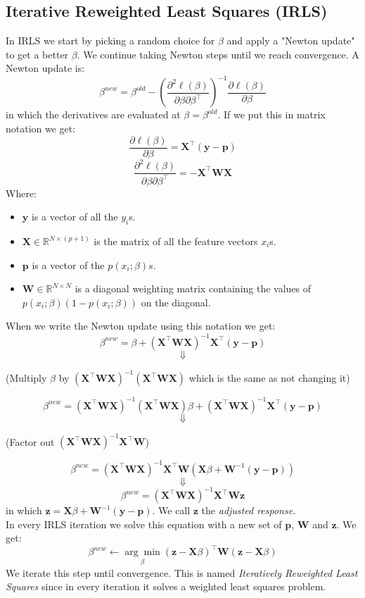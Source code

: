 \documentclass[a4paper]{article}
\begin{document}
\subsection{Iterative Reweighted Least Squares (IRLS)}
In IRLS we start by picking a random choice for $\beta$ and apply a "Newton update" to get a better $\beta$. We continue taking Newton steps until we reach convergence. 
A Newton update is:
$$\beta^{new} = \beta^{old} - \left(\frac{\partial^2 \ell(\beta)}{\partial \beta\partial \beta^\top}\right)^{-1}\frac{\partial \ell(\beta)}{\partial \beta}$$
in which the derivatives are evaluated at $\beta=\beta^{old}$.  If we put this in matrix notation we get:
$$\frac{\partial \ell(\beta)}{\partial \beta} = \mathbf{X}^\top(\mathbf{y}-\mathbf{p})$$
$$\frac{\partial^2 \ell(\beta)}{\partial \beta\partial \beta^\top} = -\mathbf{X}^\top \mathbf{W}\mathbf{X}$$
Where:
\begin{itemize}
  \item $\mathbf{y}$ is a vector of all the $y_i$s.
  \item $\mathbf{X}\in\mathbb{R}^{N\times (p+1)}$ is the matrix of all the feature vectors $x_i$s.
  \item $\mathbf{p}$ is a vector of the $p(x_i;\beta)s$.
  \item $\mathbf{W}\in\mathbb{R}^{N\times N}$ is a diagonal weighting matrix containing the values of $p(x_i;\beta)(1-p(x_i;\beta))$ on the diagonal.
\end{itemize}
When we write the Newton update using this notation we get:
$$\beta^{new} = \beta+(\mathbf{X}^\top \mathbf{W}\mathbf{X})^{-1}\mathbf{X}^\top(\mathbf{y}-\mathbf{p})$$
$$\Downarrow$$
\begin{center}{(Multiply $\beta$ by $(\mathbf{X}^\top \mathbf{W}\mathbf{X})^{-1}(\mathbf{X}^\top \mathbf{W}\mathbf{X})$ which is the same as not changing it)}\end{center}
$$\beta^{new} = (\mathbf{X}^\top \mathbf{W}\mathbf{X})^{-1}(\mathbf{X}^\top \mathbf{W}\mathbf{X})\beta+(\mathbf{X}^\top \mathbf{W}\mathbf{X})^{-1}\mathbf{X}^\top(\mathbf{y}-\mathbf{p})$$
$$\Downarrow$$
\begin{center}(Factor out $(\mathbf{X}^\top \mathbf{W}\mathbf{X})^{-1}\mathbf{X}^\top \mathbf{W}$)\end{center}
$$\beta^{new} = (\mathbf{X}^\top \mathbf{W}\mathbf{X})^{-1}\mathbf{X}^\top \mathbf{W}(\mathbf{X}\beta+\mathbf{W}^{-1}(\mathbf{y}-\mathbf{p}))$$
$$\Downarrow$$
$$\beta^{new} = (\mathbf{X}^\top \mathbf{W}\mathbf{X})^{-1}\mathbf{X}^\top \mathbf{W}\mathbf{z}$$
in which $\mathbf{z}=\mathbf{X}\beta+\mathbf{W}^{-1}(\mathbf{y}-\mathbf{p})$. We call $\mathbf{z}$ the \textit{adjusted response}.\\
In every IRLS iteration we solve this equation with a new set of $\mathbf{p}$, $\mathbf{W}$ and $\mathbf{z}$. We get:
$$\beta^{new}\leftarrow\underset{\beta}{\arg\min}(\mathbf{z}-\mathbf{X}\beta)^\top \mathbf{W}(\mathbf{z}-\mathbf{X}\beta)$$
We iterate this step until  convergence. 
This is named \emph{Iteratively Reweighted Least Squares} since in every iteration it solves a weighted least squares problem.
\end{document}
